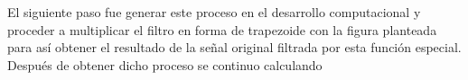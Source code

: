 \vspace{-3mm}

\vspace{-9mm}

\vspace{-9mm}

\vspace{-5mm}

El siguiente paso fue generar este proceso en el desarrollo computacional y proceder a multiplicar el filtro en forma de trapezoide con la figura planteada para así obtener el resultado de la señal original filtrada por esta función especial. Después de obtener dicho proceso se continuo calculando
